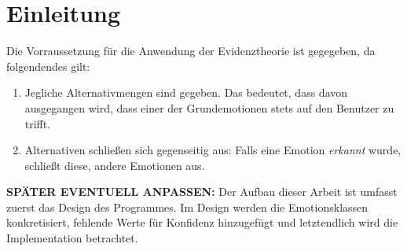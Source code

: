 \chapter{Einleitung}
Die Vorraussetzung für die Anwendung der Evidenztheorie ist gegegeben, da folgendendes gilt:

\begin{enumerate}
  \item Jegliche Alternativmengen sind gegeben. Das bedeutet, dass davon ausgegangen wird, dass einer der Grundemotionen stets auf den Benutzer zu trifft. 
  \item Alternativen schließen sich gegenseitig aus: Falls eine Emotion \textit{erkannt} wurde, schließt diese, andere Emotionen aus.
\end{enumerate}


\textbf{SPÄTER EVENTUELL ANPASSEN:}
Der Aufbau dieser Arbeit ist umfasst zuerst das Design des Programmes. Im Design werden die Emotionsklassen konkretisiert, fehlende Werte für Konfidenz hinzugefügt und letztendlich wird die Implementation betrachtet.  